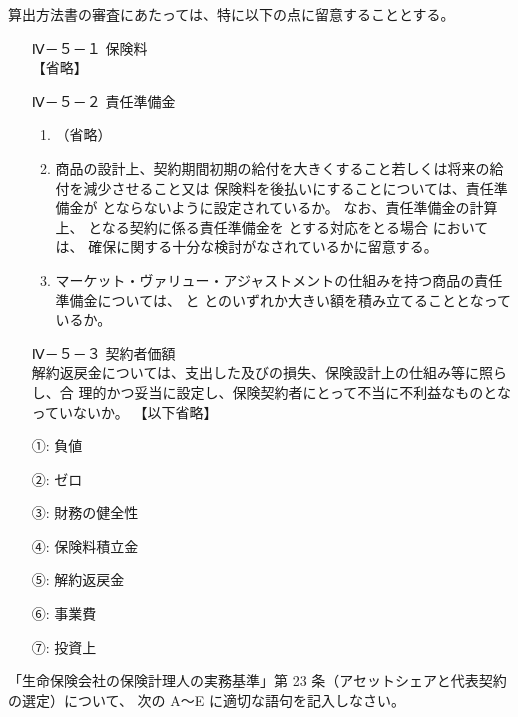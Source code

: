 \documentclass[report,gutter=10mm,fore-edge=10mm,uplatex,dvipdfmx]{jlreq}
\begin{document}
算出方法書の審査にあたっては、特に以下の点に留意することとする。
\begin{itemize}
 \item [] Ⅳ－５－１ 保険料\\
【省略】
 \item [] Ⅳ－５－２ 責任準備金
\begin{enumerate}[(1)]
\item  （省略）
\item 商品の設計上、契約期間初期の給付を大きくすること若しくは将来の給付を減少させること又は
 保険料を後払いにすることについては、責任準備金が  とならないように設定されているか。
 なお、責任準備金の計算上、  となる契約に係る責任準備金を  とする対応をとる場合
 においては、  確保に関する十分な検討がなされているかに留意する。
\item マーケット・ヴァリュー・アジャストメントの仕組みを持つ商品の責任準備金については、
 と  とのいずれか大きい額を積み立てることとなっているか。
\end{enumerate} 
\item [] Ⅳ－５－３ 契約者価額\\
解約返戻金については、支出した及びの損失、保険設計上の仕組み等に照らし、合
理的かつ妥当に設定し、保険契約者にとって不当に不利益なものとなっていないか。
【以下省略】
\end{itemize}

\answer{}
\begin{itemize}
\item[ ①:]  負値
\item[ ②:]  ゼロ
\item[ ③:]  財務の健全性
\item[ ④:]  保険料積立金
\item[ ⑤:]  解約返戻金
\item[ ⑥:]  事業費
\item[ ⑦:]  投資上
\end{itemize}

「生命保険会社の保険計理人の実務基準」第 23 条（アセットシェアと代表契約の選定）について、
次の A～E に適切な語句を記入しなさい。
\end{document}

